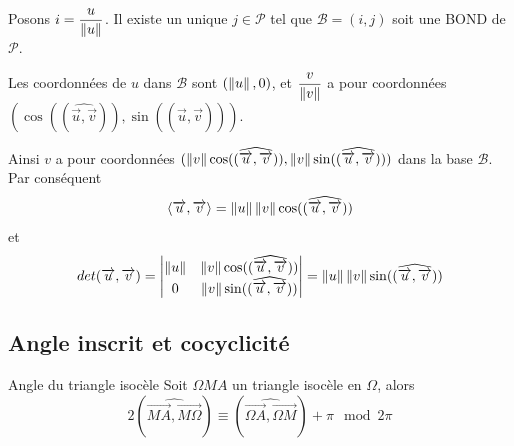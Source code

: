 \documentclass[a4paper, 12pt]{article}
\begin{document}
\begin{demonstration}
    Posons $i = \dfrac{u}{\left\lVert u\right\rVert}$. Il existe un unique $j \in \mathcal{P}$ tel que $\mathcal{B} = (i, j)$ soit une BOND de $\mathcal{P}$.

    Les coordonnées de $u$ dans $\mathcal{B}$ sont $(\left\lVert u\right\rVert, 0)$, et $\dfrac{v}{\left\lVert v\right\rVert}$ a pour coordonnées $(\cos((\widehat{\overrightarrow{u}, \overrightarrow{v}})), \sin((\widehat{\overrightarrow{u}, \overrightarrow{v}})))$.

    Ainsi $v$ a pour coordonnées $(\left\lVert v\right\rVert\cos((\widehat{\overrightarrow{u}, \overrightarrow{v}})), \left\lVert v\right\rVert\sin((\widehat{\overrightarrow{u}, \overrightarrow{v}})))$ dans la base $\mathcal{B}$.
    Par conséquent
    $$
    \langle\overrightarrow{u}, \overrightarrow{v}\rangle = \left\lVert u\right\rVert\left\lVert v\right\rVert\cos((\widehat{\overrightarrow{u}, \overrightarrow{v}}))
    $$
    et
    $$
    det(\overrightarrow{u}, \overrightarrow{v}) = \begin{vmatrix}
        \left\lVert u\right\rVert & \left\lVert v\right\rVert\cos((\widehat{\overrightarrow{u}, \overrightarrow{v}})) \\
        0 & \left\lVert v\right\rVert\sin((\widehat{\overrightarrow{u}, \overrightarrow{v}}))
    \end{vmatrix} = \left\lVert u\right\rVert\left\lVert v\right\rVert\sin((\widehat{\overrightarrow{u}, \overrightarrow{v}}))
    $$
\end{demonstration}

\subsection{Angle inscrit et cocyclicité}

\begin{lemme}{Angle du triangle isocèle}{}
    Soit $\Omega M A$ un triangle isocèle en $\Omega$, alors
    $$
    2(\widehat{\overrightarrow{MA}, \overrightarrow{M\Omega}}) \equiv (\widehat{\overrightarrow{\Omega A}, \overrightarrow{\Omega M}}) + \pi \mod 2\pi
    $$
\end{lemme}
\end{document}
